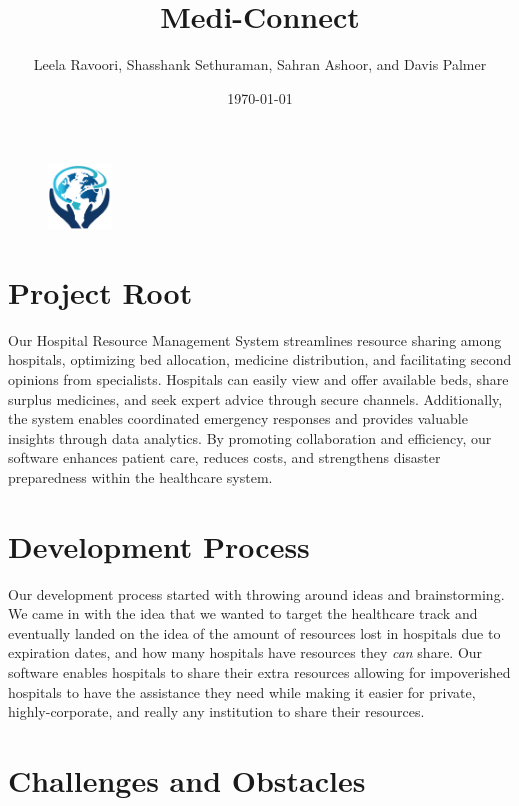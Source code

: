 \documentclass{article}
\title{Medi-Connect}
\author{Leela Ravoori, Shasshank Sethuraman, Sahran Ashoor, and Davis Palmer}
\date{\today}
\begin{document}
\maketitle
\thispagestyle{empty} %

\begin{figure}[h]
    \centering
    \includegraphics[width=0.15\textwidth]{logoFinal.png}
\end{figure}

\section*{Project Root}

Our Hospital Resource Management System streamlines resource sharing among hospitals, optimizing bed allocation, medicine distribution, and facilitating second opinions from specialists. Hospitals can easily view and offer available beds, share surplus medicines, and seek expert advice through secure channels. Additionally, the system enables coordinated emergency responses and provides valuable insights through data analytics. By promoting collaboration and efficiency, our software enhances patient care, reduces costs, and strengthens disaster preparedness within the healthcare system.

\section*{Development Process}

Our development process started with throwing around ideas and brainstorming. We came in with the idea that we wanted to target the healthcare track and eventually landed on the idea of the amount of resources lost in hospitals due to expiration dates, and how many hospitals have resources they \emph{can} share. Our software enables hospitals to share their extra resources allowing for impoverished hospitals to have the assistance they need while making it easier for private, highly-corporate, and really any institution to share their resources.

\section*{Challenges and Obstacles}
\end{document}
